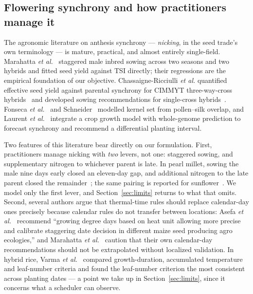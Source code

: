 \documentclass[10pt,twocolumn]{article}
\begin{document}
\subsection{Flowering synchrony and how practitioners manage it}

The agronomic literature on anthesis synchrony --- \emph{nicking}, in the
seed trade's own terminology --- is mature, practical, and almost entirely
single-field. Marahatta \textit{et al.}~\cite{marahatta2025} staggered male
inbred sowing across two seasons and two hybrids and fitted seed yield
against TSI directly; their regressions are the empirical foundation of our
objective. Chassaigne-Ricciulli \textit{et al.} quantified effective seed
yield against parental synchrony for CIMMYT three-way-cross
hybrids~\cite{chassaigne2021} and developed sowing recommendations for
single-cross hybrids~\cite{chassaigne2020}. Fonseca \textit{et
al.}~\cite{fonseca2004} and Schneider~\cite{schneider2005} modelled kernel
set from pollen--silk overlap, and Laurent \textit{et al.}~\cite{laurent2025}
integrate a crop growth model with whole-genome prediction to forecast
synchrony and recommend a differential planting interval.

Two features of this literature bear directly on our formulation. First,
practitioners manage nicking with \emph{two} levers, not one: staggered
sowing, and supplementary nitrogen to whichever parent is late. In pearl
millet, sowing the male nine days early closed an eleven-day gap, and
additional nitrogen to the late parent closed the
remainder~\cite{priyanka2017}; the same pairing is reported for
sunflower~\cite{patil2026}. We model only the first lever, and
Section~\ref{sec:limits} returns to what that omits. Second, several authors
argue that thermal-time rules should replace calendar-day ones precisely
because calendar rules do not transfer between locations: Asefa \textit{et
al.}~\cite{asefa2024} recommend ``growing degree days based on heat unit
allowing more precise and calibrate staggering date decision in different
maize seed producing agro ecologies,'' and Marahatta \textit{et
al.}~\cite{marahatta2025} caution that their own calendar-day recommendations
should not be extrapolated without localized validation. In hybrid rice,
Varma \textit{et al.}~\cite{varma2018} compared growth-duration, accumulated
temperature and leaf-number criteria and found the leaf-number criterion the
most consistent across planting dates --- a point we take up in
Section~\ref{sec:limits}, since it concerns what a scheduler can observe.
\end{document}
